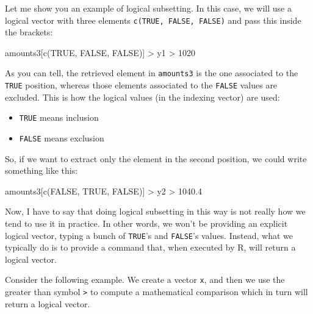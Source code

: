\documentclass[
]{book}
\newenvironment{Shaded}{\begin{snugshade}}{\end{snugshade}}
\newcommand{\ConstantTok}[1]{\textcolor[rgb]{0.00,0.00,0.00}{#1}}
\newcommand{\DecValTok}[1]{\textcolor[rgb]{0.00,0.00,0.81}{#1}}
\newcommand{\FloatTok}[1]{\textcolor[rgb]{0.00,0.00,0.81}{#1}}
\newcommand{\FunctionTok}[1]{\textcolor[rgb]{0.00,0.00,0.00}{#1}}
\newcommand{\NormalTok}[1]{#1}
\newcommand{\SpecialCharTok}[1]{\textcolor[rgb]{0.00,0.00,0.00}{#1}}
\providecommand{\tightlist}{%
  \setlength{\itemsep}{0pt}\setlength{\parskip}{0pt}}
\begin{document}
Let me show you an example of logical subsetting. In this case, we will use a
logical vector with three elements \texttt{c(TRUE,\ FALSE,\ FALSE)} and pass this
inside the brackets:

\begin{Shaded}
\begin{Highlighting}[]
\NormalTok{amounts3[}\FunctionTok{c}\NormalTok{(}\ConstantTok{TRUE}\NormalTok{, }\ConstantTok{FALSE}\NormalTok{, }\ConstantTok{FALSE}\NormalTok{)]}
\SpecialCharTok{\textgreater{}}\NormalTok{   y1 }
\SpecialCharTok{\textgreater{}} \DecValTok{1020}
\end{Highlighting}
\end{Shaded}

As you can tell, the retrieved element in \texttt{amounts3} is the one associated to
the \texttt{TRUE} position, whereas those elements associated to the \texttt{FALSE} values
are excluded. This is how the logical values (in the indexing vector) are used:

\begin{itemize}
\tightlist
\item
  \texttt{TRUE} means inclusion
\item
  \texttt{FALSE} means exclusion
\end{itemize}

So, if we want to extract only the element in the second position, we could
write something like this:

\begin{Shaded}
\begin{Highlighting}[]
\NormalTok{amounts3[}\FunctionTok{c}\NormalTok{(}\ConstantTok{FALSE}\NormalTok{, }\ConstantTok{TRUE}\NormalTok{, }\ConstantTok{FALSE}\NormalTok{)]}
\SpecialCharTok{\textgreater{}}\NormalTok{     y2 }
\SpecialCharTok{\textgreater{}} \FloatTok{1040.4}
\end{Highlighting}
\end{Shaded}

Now, I have to say that doing logical subsetting in this way is not really
how we tend to use it in practice. In other words, we won't be providing an
explicit logical vector, typing a bunch of \texttt{TRUE}'s and \texttt{FALSE}'s values.
Instead, what we typically do is to provide a command that, when executed by R,
will return a logical vector.

Consider the following example. We create a vector \texttt{x}, and then we use the
greater than symbol \texttt{\textgreater{}} to compute a mathematical comparison which in turn
will return a logical vector.
\end{document}
